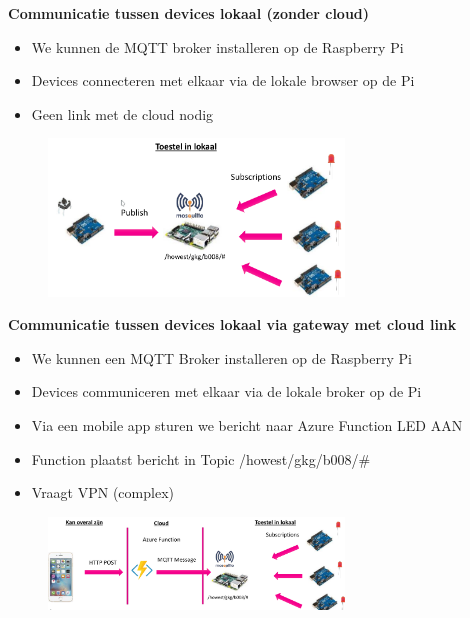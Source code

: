 \documentclass{article}
\newcommand{\bold}[1]{\textbf{#1}}
\begin{document}
\bold{Communicatie tussen devices lokaal (zonder cloud)}

\begin{itemize}
    \item We kunnen de MQTT broker installeren op de Raspberry Pi
    \item Devices connecteren met elkaar via de lokale browser op de Pi
    \item Geen link met de cloud nodig
\end{itemize}

\begin{figure}[H]
    \centering
    \includegraphics[width=0.7\textwidth]{mqtt-com4.png}
    \caption{}
\end{figure}

\bold{Communicatie tussen devices lokaal via gateway met cloud link}

\begin{itemize}
    \item We kunnen een MQTT Broker installeren op de Raspberry Pi
    \item Devices communiceren met elkaar via de lokale broker op de Pi
    \item Via een mobile app sturen we bericht naar Azure Function LED AAN
    \item Function plaatst bericht in Topic /howest/gkg/b008/\#
    \item Vraagt VPN (complex)
\end{itemize}

\begin{figure}[H]
    \centering
    \includegraphics[width=0.7\textwidth]{mqtt-com5.png}
    \caption{}
\end{figure}
\end{document}
